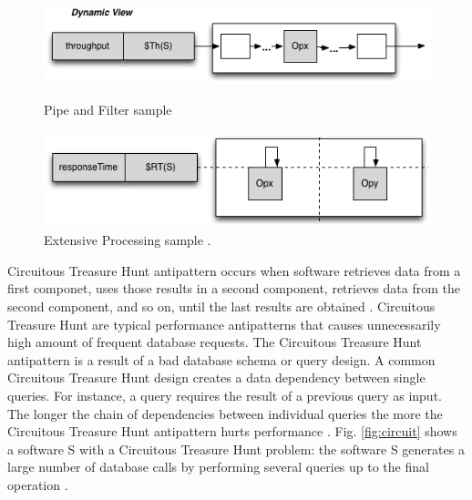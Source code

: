 \documentclass[espaco=umemeio,chapter=TITLE,twoside,openright]{abnt}
\begin{document}
\begin{figure}[h]
\begin{minipage}{.5\textwidth}
\centering
\includegraphics[width=1\textwidth]{./images/pipe2.png}
\caption{Pipe and Filter sample \cite{Vetoio2011}}
\label{fig:pipefilter}
\end{minipage}
\begin{minipage}{.5\textwidth}
\centering
\includegraphics[width=1\textwidth]{./images/extpro.png}
\caption{Extensive Processing sample \cite{Vetoio2011}.}
\label{fig:extpro}
\end{minipage}
\end{figure}


Circuitous Treasure Hunt antipattern occurs when software retrieves data from a first componet, uses those results in a second component, retrieves data from the second component, and so on, until the last results are obtained \cite{Smith2002} \cite{Smith2003}. Circuitous Treasure Hunt
are typical performance antipatterns that causes  unnecessarily high amount of frequent database requests. The Circuitous Treasure Hunt antipattern is a result of a bad database schema or query design. A common Circuitous Treasure Hunt design creates a data dependency between single queries. For instance, a query requires the
result of a previous query as input. The longer the chain of
dependencies between individual queries the more the Circuitous
Treasure Hunt antipattern hurts performance \cite{Wert2014}. Fig. \ref{fig:circuit}  shows a software S with a Circuitous Treasure Hunt problem: the software  S generates a large number of database calls by performing several queries up to the final operation \cite{Vetoio2011}.
\end{document}
